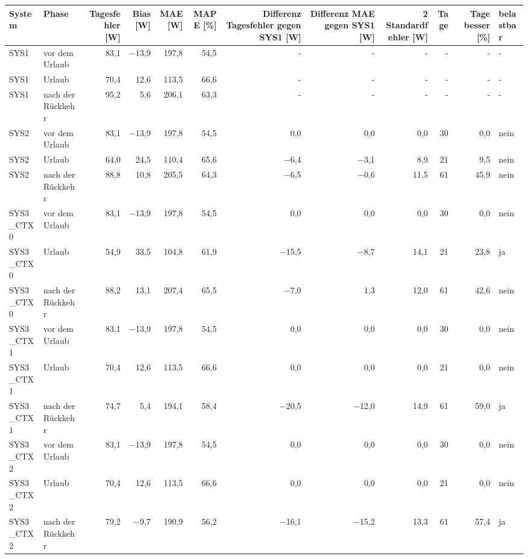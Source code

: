 \begin{tabular}{llrrrrrrrrrl}
\toprule
System & Phase & Tagesfehler [W] & Bias [W] & MAE [W] & MAPE [\%] & Differenz Tagesfehler gegen SYS1 [W] & Differenz MAE gegen SYS1 [W] & 2 Standardfehler [W] & Tage & Tage besser [\%] & belastbar \\
\midrule
SYS1 & vor dem Urlaub & 83,1 & $-$13,9 & 197,8 & 54,5 & - & - & - & - & - & - \\
SYS1 & Urlaub & 70,4 & 12,6 & 113,5 & 66,6 & - & - & - & - & - & - \\
SYS1 & nach der Rückkehr & 95,2 & 5,6 & 206,1 & 63,3 & - & - & - & - & - & - \\
SYS2 & vor dem Urlaub & 83,1 & $-$13,9 & 197,8 & 54,5 & 0,0 & 0,0 & 0,0 & 30 & 0,0 & nein \\
SYS2 & Urlaub & 64,0 & 24,5 & 110,4 & 65,6 & $-$6,4 & $-$3,1 & 8,9 & 21 & 9,5 & nein \\
SYS2 & nach der Rückkehr & 88,8 & 10,8 & 205,5 & 64,3 & $-$6,5 & $-$0,6 & 11,5 & 61 & 45,9 & nein \\
SYS3\_CTX0 & vor dem Urlaub & 83,1 & $-$13,9 & 197,8 & 54,5 & 0,0 & 0,0 & 0,0 & 30 & 0,0 & nein \\
SYS3\_CTX0 & Urlaub & 54,9 & 33,5 & 104,8 & 61,9 & $-$15,5 & $-$8,7 & 14,1 & 21 & 23,8 & ja \\
SYS3\_CTX0 & nach der Rückkehr & 88,2 & 13,1 & 207,4 & 65,5 & $-$7,0 & 1,3 & 12,0 & 61 & 42,6 & nein \\
SYS3\_CTX1 & vor dem Urlaub & 83,1 & $-$13,9 & 197,8 & 54,5 & 0,0 & 0,0 & 0,0 & 30 & 0,0 & nein \\
SYS3\_CTX1 & Urlaub & 70,4 & 12,6 & 113,5 & 66,6 & 0,0 & 0,0 & 0,0 & 21 & 0,0 & nein \\
SYS3\_CTX1 & nach der Rückkehr & 74,7 & 5,4 & 194,1 & 58,4 & $-$20,5 & $-$12,0 & 14,9 & 61 & 59,0 & ja \\
SYS3\_CTX2 & vor dem Urlaub & 83,1 & $-$13,9 & 197,8 & 54,5 & 0,0 & 0,0 & 0,0 & 30 & 0,0 & nein \\
SYS3\_CTX2 & Urlaub & 70,4 & 12,6 & 113,5 & 66,6 & 0,0 & 0,0 & 0,0 & 21 & 0,0 & nein \\
SYS3\_CTX2 & nach der Rückkehr & 79,2 & $-$9,7 & 190,9 & 56,2 & $-$16,1 & $-$15,2 & 13,3 & 61 & 57,4 & ja \\
\bottomrule
\end{tabular}
